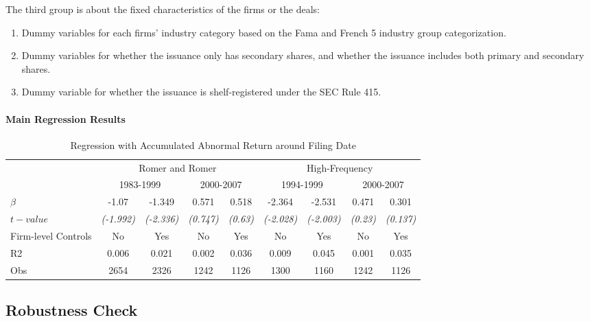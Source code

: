 \documentclass[11pt]{article}
\begin{document}
The third group is about the fixed characteristics of the firms or the deals: 
\begin{enumerate}
	\item Dummy variables for each firms' industry category based on the Fama and French 5 industry group categorization.
	\item Dummy variables for whether the issuance only has secondary shares, and whether the issuance includes both primary and secondary shares.
	\item Dummy variable for whether the issuance is shelf-registered under the SEC Rule 415.
\end{enumerate}

\paragraph{Main Regression Results}
\begin{table}[htbp]
	\centering
	\caption{Regression with Accumulated Abnormal Return around Filing Date}
	\begin{tabular}{lcccccccc}
		\toprule
		& \multicolumn{4}{c}{Romer and Romer } & \multicolumn{4}{c}{High-Frequency} \\
		& \multicolumn{2}{c}{1983-1999} & \multicolumn{2}{c}{2000-2007} & \multicolumn{2}{c}{1994-1999} & \multicolumn{2}{c}{2000-2007}\\
		\midrule
		$ \beta $ & -1.07 & -1.349 & 0.571 & 0.518 & -2.364 & -2.531 & 0.471 & 0.301\\
		$ t-value $& \textit{(-1.992)} & \textit{(-2.336)} & \textit{(0.747)} & \textit{(0.63)} & \textit{(-2.028)} & \textit{(-2.003)} & \textit{(0.23)} & \textit{(0.137)}\\
		\midrule
		Firm-level Controls & \multicolumn{1}{c}{No} & \multicolumn{1}{c}{Yes} & \multicolumn{1}{c}{No} & \multicolumn{1}{c}{Yes} & \multicolumn{1}{c}{No} & \multicolumn{1}{c}{Yes} & \multicolumn{1}{c}{No} & \multicolumn{1}{c}{Yes} \\
		R2    & 0.006 & 0.021 & 0.002 & 0.036 & 0.009 & 0.045 & 0.001 & 0.035 \\
		Obs   & 2654  & 2326  & 1242  & 1126  & 1300  & 1160  & 1242  & 1126 \\
		\bottomrule
	\end{tabular}%
	\label{tab:addlabel}%
\end{table}%
\subsection{Robustness Check}
\end{document}
